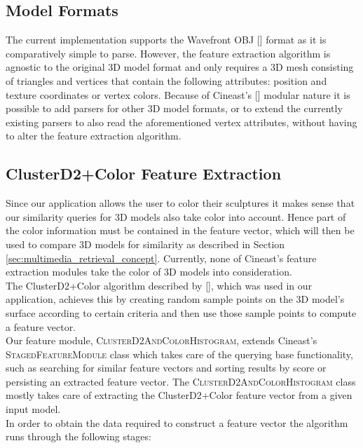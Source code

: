 \subsection{Model Formats}

The current implementation supports the Wavefront OBJ [] format as it is comparatively
simple to parse. However, the feature extraction algorithm is agnostic to the original 3D model format and only requires
a 3D mesh consisting of triangles and vertices that contain the following attributes: position and texture coordinates or vertex colors.
Because of Cineast's [] modular nature it is possible to add parsers for other 3D model formats, or
to extend the currently existing parsers to also read the aforementioned vertex attributes, without having to alter
the feature extraction algorithm.

\subsection{ClusterD2+Color Feature Extraction}

Since our application allows the user to color their sculptures it makes sense that our similarity queries for 3D models also
take color into account. Hence part of the color information must be contained in the feature vector, which will then be used
to compare 3D models for similarity as described in Section \ref{sec:multimedia_retrieval_concept}.
Currently, none of Cineast's feature extraction modules take the color of 3D models into consideration.\\
The ClusterD2+Color algorithm described by [], which was used in our application,
achieves this by creating random sample points on the 3D model's surface according to certain criteria and then
use those sample points to compute a feature vector.\\
Our feature module, \textsc{ClusterD2AndColorHistogram}, extends Cineast's \textsc{StagedFeatureModule} class which takes care of the
querying base functionality, such as searching for similar feature vectors and sorting results by score or persisting an extracted feature vector.
The \textsc{ClusterD2AndColorHistogram} class mostly takes care of extracting the ClusterD2+Color feature vector from a given input model.\\
In order to obtain the data required to construct a feature vector the algorithm runs through the following stages:

